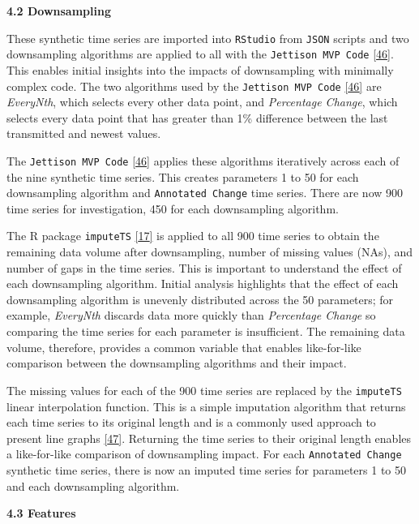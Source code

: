 \documentclass{article}
\begin{document}
\textbf{4.2 Downsampling}

These synthetic time series are imported into \texttt{RStudio} from
\texttt{JSON} scripts and two downsampling algorithms are applied to all
with the \texttt{Jettison\ MVP\ Code}
\protect\hyperlink{ref-Jettison}{{[}46{]}}. This enables initial
insights into the impacts of downsampling with minimally complex code.
The two algorithms used by the \texttt{Jettison\ MVP\ Code}
\protect\hyperlink{ref-Jettison}{{[}46{]}} are \emph{EveryNth}, which
selects every other data point, and \emph{Percentage Change}, which
selects every data point that has greater than 1\% difference between
the last transmitted and newest values.

The \texttt{Jettison\ MVP\ Code}
\protect\hyperlink{ref-Jettison}{{[}46{]}} applies these algorithms
iteratively across each of the nine synthetic time series. This creates
parameters 1 to 50 for each downsampling algorithm and
\texttt{Annotated\ Change} time series. There are now 900 time series
for investigation, 450 for each downsampling algorithm.

The R package \texttt{imputeTS}
\protect\hyperlink{ref-imputeTS_R}{{[}17{]}} is applied to all 900 time
series to obtain the remaining data volume after downsampling, number of
missing values (NAs), and number of gaps in the time series. This is
important to understand the effect of each downsampling algorithm.
Initial analysis highlights that the effect of each downsampling
algorithm is unevenly distributed across the 50 parameters; for example,
\emph{EveryNth} discards data more quickly than \emph{Percentage Change}
so comparing the time series for each parameter is insufficient. The
remaining data volume, therefore, provides a common variable that
enables like-for-like comparison between the downsampling algorithms and
their impact.

The missing values for each of the 900 time series are replaced by the
\texttt{imputeTS} linear interpolation function. This is a simple
imputation algorithm that returns each time series to its original
length and is a commonly used approach to present line graphs
\protect\hyperlink{ref-compressiontech}{{[}47{]}}. Returning the time
series to their original length enables a like-for-like comparison of
downsampling impact. For each \texttt{Annotated\ Change} synthetic time
series, there is now an imputed time series for parameters 1 to 50 and
each downsampling algorithm.

\textbf{4.3 Features}
\end{document}
